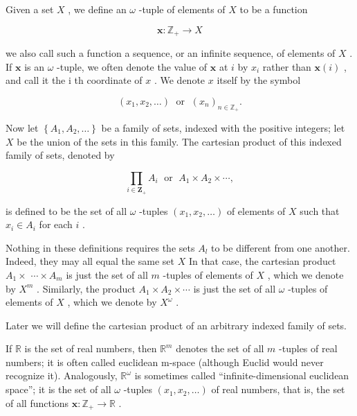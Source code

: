 \begin{definition} Given a set \(X\) , we define an \(\omega\) -tuple of elements of \(X\) to be a function

\[
\mathbf{x} : {\mathbb{Z}}_{ + } \rightarrow  X
\]

we also call such a function a sequence, or an infinite sequence, of elements of \(X\) . If \(\mathbf{x}\) is an \(\omega\) -tuple, we often denote the value of \(\mathbf{x}\) at \(i\) by \({x}_{i}\) rather than \(\mathbf{x}\left( i\right)\) , and call it the i th coordinate of \(x\) . We denote \(x\) itself by the symbol

\[
\left( {{x}_{1},{x}_{2},\ldots }\right) \;\text{ or }\;{\left( {x}_{n}\right) }_{n \in  {\mathbb{Z}}_{ + }}.
\]
\end{definition}


Now let \(\left\{  {{A}_{1},{A}_{2},\ldots }\right\}\) be a family of sets, indexed with the positive integers; let \(X\) be the union of the sets in this family. The cartesian product of this indexed family of sets, denoted by

\[
\mathop{\prod }\limits_{{i \in  {\mathbf{Z}}_{ + }}}{A}_{i}\;\text{ or }\;{A}_{1} \times  {A}_{2} \times  \cdots ,
\]

is defined to be the set of all \(\omega\) -tuples \(\left( {{x}_{1},{x}_{2},\ldots }\right)\) of elements of \(X\) such that \({x}_{i} \in  {A}_{i}\) for each \(i\) .

Nothing in these definitions requires the sets \({A}_{l}\) to be different from one another. Indeed, they may all equal the same set \(X\) In that case, the cartesian product \({A}_{1} \times\)  \(\cdots  \times  {A}_{m}\) is just the set of all \(m\) -tuples of elements of \(X\) , which we denote by \({X}^{m}\) . Similarly, the product \({A}_{1} \times  {A}_{2} \times  \cdots\) is just the set of all \(\omega\) -tuples of elements of \(X\) , which we denote by \({X}^{\omega }\) .

Later we will define the cartesian product of an arbitrary indexed family of sets.

\begin{centeredblock}
\begin{example} If \(\mathbb{R}\) is the set of real numbers, then \({\mathbb{R}}^{m}\) denotes the set of all \(m\) -tuples of real numbers; it is often called euclidean m-space (although Euclid would never recognize it). Analogously, \({\mathbb{R}}^{\omega }\) is sometimes called ``infinite-dimensional euclidean space''; it is the set of all \(\omega\) -tuples \(\left( {{x}_{1},{x}_{2},\ldots }\right)\) of real numbers, that is, the set of all functions \(\mathbf{x} : {\mathbb{Z}}_{ + } \rightarrow  \mathbb{R}\) .
\end{example}
\end{centeredblock}


